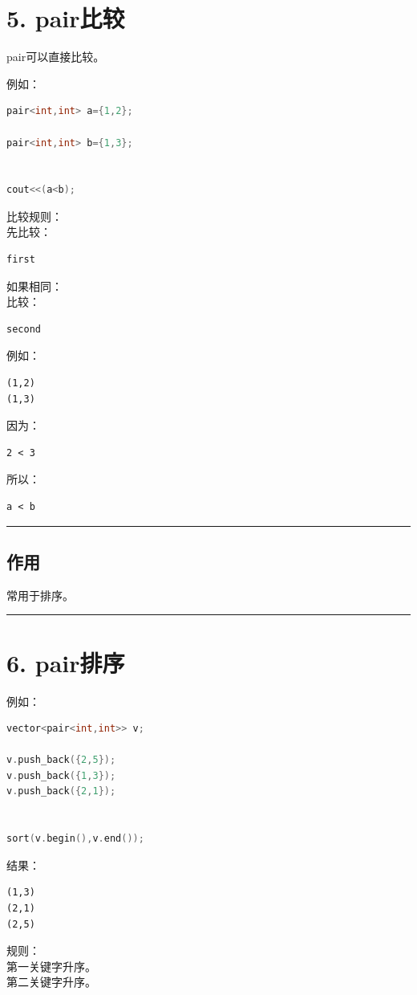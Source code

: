 \documentclass[9pt,twocolumn]{extarticle}
\begin{document}
\section{5. pair比较}

pair可以直接比较。

例如：
\begin{lstlisting}[language=C++]
pair<int,int> a={1,2};

pair<int,int> b={1,3};


cout<<(a<b);
\end{lstlisting}
比较规则：\\
先比较：
\begin{lstlisting}
first
\end{lstlisting}
如果相同：\\
比较：
\begin{lstlisting}
second
\end{lstlisting}
例如：
\begin{lstlisting}
(1,2)
(1,3)
\end{lstlisting}
因为：
\begin{lstlisting}
2 < 3
\end{lstlisting}
所以：
\begin{lstlisting}
a < b
\end{lstlisting}

\noindent\rule{\linewidth}{0.4pt}

\subsection{作用}
常用于排序。

\noindent\rule{\linewidth}{0.4pt}

\section{6. pair排序}

例如：
\begin{lstlisting}[language=C++]
vector<pair<int,int>> v;

v.push_back({2,5});
v.push_back({1,3});
v.push_back({2,1});


sort(v.begin(),v.end());
\end{lstlisting}
结果：
\begin{lstlisting}
(1,3)
(2,1)
(2,5)
\end{lstlisting}
规则：\\
第一关键字升序。\\
第二关键字升序。
\end{document}
